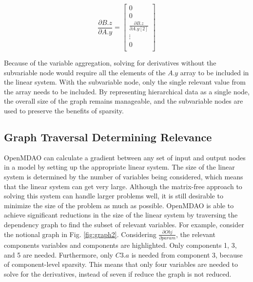 \documentclass[]{aiaa-tc} %
\begin{document}
    \begin{equation}
        \frac{\partial B.z}{\partial A.y} =
        \begin{bmatrix}
            0 \\
            0 \\
            \frac{\partial B.z}{\partial A.y[2]} \\
            \vdots \\
            0 \\
        \end{bmatrix}
        \label{eqn:sparse_gradient}
    \end{equation}

    Because of the variable aggregation, solving for derivatives without the subvariable node would require 
    all the elements of the $A.y$ array to be included in the linear system.
    With the subvariable node, only the single relevant value from the array needs to be included.
    By representing hierarchical data as a single node, the overall size of the graph
    remains manageable, and the subvariable nodes are used to preserve the benefits of sparsity.


    \subsection{Graph Traversal Determining Relevance}

        OpenMDAO can calculate a gradient between any set of input and output nodes in a  
        model by setting up the appropriate linear system. The size of the linear system
        is determined by the number of variables being considered, which means that the linear
        system can get very large. Although the matrix-free approach to solving this system 
        can handle larger problems well, it is still desirable to minimize the size of the problem 
        as much as possible. OpenMDAO is able to achieve significant reductions in the
        size of the linear system by traversing the dependency graph to find the subset of relevant variables.
        For example, consider the notional graph in Fig. \ref{fig:graph2}. Considering $\frac{\partial Obj}{\partial param}$,
        the relevant components variables and components are highlighted. Only components 1, 3, and 5 are needed.
        Furthermore, only $C3.a$ is needed from component 3, because of component-level sparsity. 
        This means that only four variables are needed to solve for the derivatives, 
        instead of seven if reduce the graph is not reduced. 
\end{document}
